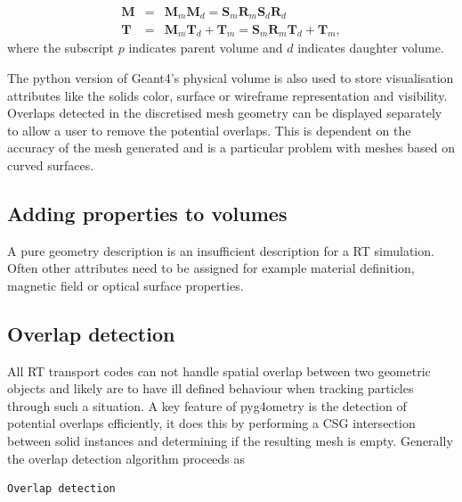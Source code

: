 \documentclass[final,5p,times,twocolumn]{elsarticle}
\begin{document}
\begin{eqnarray}
\mathbf{M}	  	& = & \mathbf{M}_m \mathbf{M}_d  = \mathbf{S}_m \mathbf{R}_m  \mathbf{S}_d \mathbf{R}_d\\
\mathbf{T}	 		& = & \mathbf{M}_m \mathbf{T}_d + \mathbf{T}_m= \mathbf{S}_m \mathbf{R}_m \mathbf{T}_d + \mathbf{T}_m,
\end{eqnarray}
where the subscript $p$ indicates parent volume and $d$ indicates daughter volume.

The python version of Geant4's physical volume is also used to store visualisation attributes like the solids 
color, surface or wireframe representation and visibility. Overlaps detected in the discretised mesh geometry can be displayed separately to allow a user to remove
the potential overlaps. This is dependent on the accuracy of the mesh generated and is a particular problem with meshes based on curved surfaces.    

\subsection{Adding properties to volumes}
A pure geometry description is an insufficient description for a RT simulation. Often other attributes need to be assigned for example material definition, magnetic field or  
optical surface properties.  

\subsection{Overlap detection}
All RT transport codes can not handle spatial overlap between two geometric objects and likely are to have ill defined behaviour when tracking particles  
through such a situation.  A key feature of pyg4ometry is the detection of potential overlaps efficiently, it does this by performing a CSG intersection between solid instances 
and determining if the resulting mesh is empty. Generally the overlap detection algorithm proceeds as 

{\small 
\begin{verbatim}
Overlap detection
\end{verbatim}
} 
\end{document}
